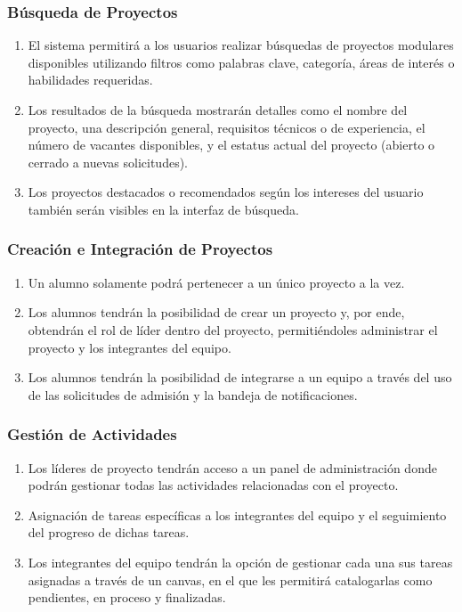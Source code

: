 	\subsubsection{Búsqueda de Proyectos}

	\begin{enumerate}
		\item El sistema permitirá a los usuarios realizar búsquedas de proyectos modulares
			disponibles utilizando filtros como palabras clave, categoría, áreas de interés
			o habilidades requeridas.

		\item Los resultados de la búsqueda mostrarán detalles como el nombre del proyecto,
			una descripción general, requisitos técnicos o de experiencia, el número de
			vacantes disponibles, y el estatus actual del proyecto (abierto o cerrado a
			nuevas solicitudes).

		\item Los proyectos destacados o recomendados según los intereses del usuario también
			serán visibles en la interfaz de búsqueda.
	\end{enumerate}

	\subsubsection{Creación e Integración de Proyectos}

	\begin{enumerate}
		\item Un alumno solamente podrá pertenecer a un único proyecto a la vez.

		\item Los alumnos tendrán la posibilidad de crear un proyecto y, por ende, obtendrán
			el rol de líder dentro del proyecto, permitiéndoles administrar el proyecto
			y los integrantes del equipo.

		\item Los alumnos tendrán la posibilidad de integrarse a un equipo a través del
			uso de las solicitudes de admisión y la bandeja de notificaciones.
	\end{enumerate}

	\subsubsection{Gestión de Actividades}

	\begin{enumerate}
		\item Los líderes de proyecto tendrán acceso a un panel de administración donde
			podrán gestionar todas las actividades relacionadas con el proyecto.

		\item Asignación de tareas específicas a los integrantes del equipo y el seguimiento
			del progreso de dichas tareas.

		\item Los integrantes del equipo tendrán la opción de gestionar cada una sus tareas
			asignadas a través de un canvas, en el que les permitirá catalogarlas como
			pendientes, en proceso y finalizadas.
	\end{enumerate}

